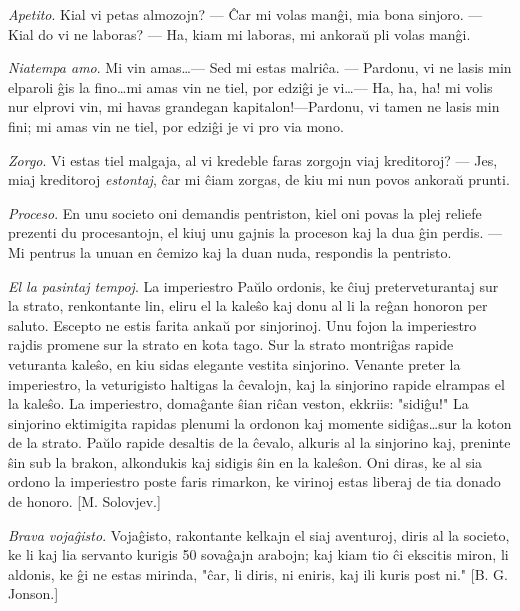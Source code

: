 \emph{Apetito}. Kial vi petas almozojn? --- \^Car mi volas man\^gi,
mia bona sinjoro. --- Kial do vi ne laboras? --- Ha, kiam mi
laboras, mi ankora\u u pli volas man\^gi.

\emph{Niatempa amo}. Mi vin amas\dots --- Sed mi estas malri\^ca.
--- Pardonu, vi ne lasis min elparoli \^gis la fino\dots mi amas vin
ne tiel, por edzi\^gi je vi\dots --- Ha, ha, ha! mi volis nur
elprovi vin, mi havas grandegan kapitalon!---Pardonu, vi tamen ne
lasis min fini; mi amas vin ne tiel, por edzi\^gi je vi pro via
mono.

\emph{Zorgo}. Vi estas tiel malgaja, al vi kredeble faras zorgojn
viaj kreditoroj? --- Jes, miaj kreditoroj {\sl estontaj}, \^car mi
\^ciam zorgas, de kiu mi nun povos ankora\u u prunti.

\emph{Proceso}. En unu societo oni demandis pentriston, kiel oni
povas la plej reliefe prezenti du procesantojn, el kiuj unu gajnis
la proceson kaj la dua \^gin perdis. --- Mi pentrus la unuan en
\^cemizo kaj la duan nuda, respondis la pentristo.

\emph{El la pasintaj tempoj}. La imperiestro Pa\u ulo ordonis, ke
\^ciuj preterveturantaj sur la strato, renkontante lin, eliru el la
kale\^so kaj donu al li la re\^gan honoron per saluto. Escepto ne
estis farita anka\u u por sinjorinoj. Unu fojon la imperiestro
rajdis promene sur la strato en kota tago. Sur la strato montri\^gas
rapide veturanta kale\^so, en kiu sidas elegante vestita sinjorino.
Venante preter la imperiestro, la veturigisto haltigas la
\^cevalojn, kaj la sinjorino rapide elrampas el la kale\^so. La
imperiestro, doma\^gante \^sian ri\^can veston, ekkriis:
"sidi\^gu!" La sinjorino ektimigita rapidas plenumi la ordonon kaj
momente sidi\^gas\dots sur la koton de la strato. Pa\u ulo rapide
desaltis de la \^cevalo, alkuris al la sinjorino kaj, preninte \^sin
sub la brakon, alkondukis kaj sidigis \^sin en la kale\^son. Oni
diras, ke al sia ordono la imperiestro poste faris rimarkon, ke
virinoj estas liberaj de tia donado de honoro. [M. Solovjev.]

\emph{Brava voja\^gisto}. Voja\^gisto, rakontante kelkajn el siaj
aventuroj, diris al la societo, ke li kaj lia servanto kurigis 50
sova\^gajn arabojn; kaj kiam tio \^ci ekscitis miron, li aldonis, ke
\^gi ne estas mirinda, "\^car, li diris, ni eniris, kaj ili kuris
post ni." [B. G. Jonson.]

